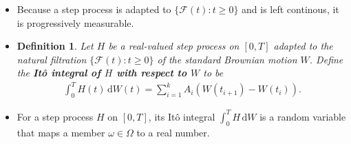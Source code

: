 \documentclass[10pt]{article}
\newtheorem{definition}[lemma]{Definition}
\newcommand{\dee}{\mathrm{d}}
\newcommand{\mcal}[1]{\mathcal{#1}}
\newcommand{\Real}{\mathbb{R}}
\newcommand{\one}{\mathbbm{1}}
\begin{document}
\begin{itemize}
  \begin{definition}
    A {\bf step process on $[0,T]$ adapted to filteration $\{ \mcal{F}_t : t \geq 0\}$ } is a real-valued stochastic process $H: [0,T] \times \Omega \rightarrow \Real$ of the form
    \begin{align*}
      H(t,\omega) = \sum_{i=1}^k A_i(\omega) \one_{[t_{i}, t_{i+1})}(t)
    \end{align*}
    where 
    \begin{itemize}
      \item $0 = t_1 \leq t_2 \leq \dotsb \leq t_{k+1} = T$,
      \item $A_i$ is a random variable that is $\mcal{F}(t_i)$-measurable, and 
      \item $\one_{[t_{i-1}, t_{i+1})}(t)$ is the indicator function of the interval $[t_{i}, t_{i+1})$. That is,
      \begin{align*}
        \one_{[t_{i}, t_{i+1})}(t) = \begin{cases}
          1, & t_{i} \leq t < t_{i+1} \\
          0, & \mbox{otherwise}
        \end{cases}.
      \end{align*}  
    \end{itemize}      
  \end{definition}

  Note that the path of a step process takes only finitely many values.

  \item Because a step process is adapted to $\{ \mcal{F}(t) : t \geq 0 \}$ and is left continous, it is progressively measurable.

  \item \begin{definition}
    Let $H$ be a real-valued step process on $[0,T]$ adapted to the natural filtration $\{ \mcal{F}(t): t \geq 0 \}$ of the standard Brownian motion $W$. Define the {\bf It\^{o} integral of $H$ with respect to $W$} to be
    \begin{align*}
      \int_0^T H(t)\, \dee W(t) = \sum_{i=1}^k A_i ( W(t_{i+1}) - W(t_{i})).
    \end{align*}    
  \end{definition}

  \item For a step process $H$ on $[0,T]$, its It\^{o} integral $\int_0^T H\, \dee W$ is a random variable that maps a member $\omega \in \Omega$ to a real number.


\end{itemize}
\end{document}
